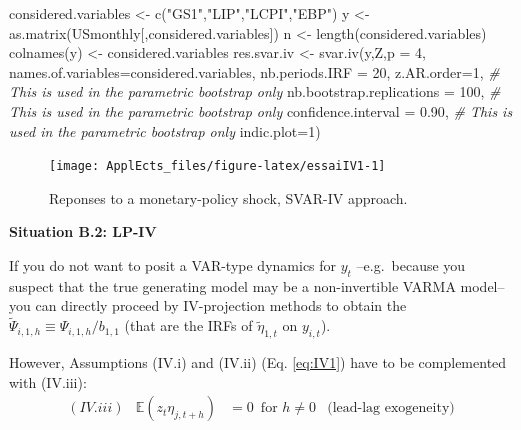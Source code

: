 \documentclass[
  12pt,
]{book}
\newenvironment{Shaded}{\begin{snugshade}}{\end{snugshade}}
\newcommand{\AttributeTok}[1]{\textcolor[rgb]{0.77,0.63,0.00}{#1}}
\newcommand{\CommentTok}[1]{\textcolor[rgb]{0.56,0.35,0.01}{\textit{#1}}}
\newcommand{\DecValTok}[1]{\textcolor[rgb]{0.00,0.00,0.81}{#1}}
\newcommand{\FloatTok}[1]{\textcolor[rgb]{0.00,0.00,0.81}{#1}}
\newcommand{\FunctionTok}[1]{\textcolor[rgb]{0.00,0.00,0.00}{#1}}
\newcommand{\NormalTok}[1]{#1}
\newcommand{\OtherTok}[1]{\textcolor[rgb]{0.56,0.35,0.01}{#1}}
\newcommand{\StringTok}[1]{\textcolor[rgb]{0.31,0.60,0.02}{#1}}
\theoremstyle{definition}
\theoremstyle{definition}
\theoremstyle{definition}
\theoremstyle{definition}
\theoremstyle{remark}
\begin{document}
\begin{Shaded}
\begin{Highlighting}[]
\NormalTok{considered.variables }\OtherTok{\textless{}{-}} \FunctionTok{c}\NormalTok{(}\StringTok{"GS1"}\NormalTok{,}\StringTok{"LIP"}\NormalTok{,}\StringTok{"LCPI"}\NormalTok{,}\StringTok{"EBP"}\NormalTok{)}
\NormalTok{y }\OtherTok{\textless{}{-}} \FunctionTok{as.matrix}\NormalTok{(USmonthly[,considered.variables])}
\NormalTok{n }\OtherTok{\textless{}{-}} \FunctionTok{length}\NormalTok{(considered.variables)}
\FunctionTok{colnames}\NormalTok{(y) }\OtherTok{\textless{}{-}}\NormalTok{ considered.variables}
\NormalTok{res.svar.iv }\OtherTok{\textless{}{-}} \FunctionTok{svar.iv}\NormalTok{(y,Z,}\AttributeTok{p =} \DecValTok{4}\NormalTok{,}
                       \AttributeTok{names.of.variables=}\NormalTok{considered.variables,}
                       \AttributeTok{nb.periods.IRF =} \DecValTok{20}\NormalTok{,}
                       \AttributeTok{z.AR.order=}\DecValTok{1}\NormalTok{, }\CommentTok{\# This is used in the parametric bootstrap only}
                       \AttributeTok{nb.bootstrap.replications =} \DecValTok{100}\NormalTok{, }\CommentTok{\# This is used in the parametric bootstrap only}
                       \AttributeTok{confidence.interval =} \FloatTok{0.90}\NormalTok{, }\CommentTok{\# This is used in the parametric bootstrap only}
                       \AttributeTok{indic.plot=}\DecValTok{1}\NormalTok{)}
\end{Highlighting}
\end{Shaded}

\begin{figure}
\texttt{[image: ApplEcts\_files/figure-latex/essaiIV1-1]} \caption{Reponses to a monetary-policy shock, SVAR-IV approach.}\label{fig:essaiIV1}
\end{figure}

\textbf{Situation B.2: LP-IV}

If you do not want to posit a VAR-type dynamics for \(y_t\) --e.g.~because you suspect that the true generating model may be a non-invertible VARMA model-- you can directly proceed by IV-projection methods to obtain the \(\tilde\Psi_{i,1,h}\equiv \Psi_{i,1,h}/b_{1,1}\) (that are the IRFs of \(\tilde\eta_{1,t}\) on \(y_{i,t}\)).

However, Assumptions (IV.i) and (IV.ii) (Eq. \eqref{eq:IV1}) have to be complemented with (IV.iii):
\begin{equation*}
\begin{array}{llll}
(IV.iii) & \mathbb{E}(z_t \eta_{j,t+h}) &= 0 \, \mbox{ for } h \ne 0 & \mbox{(lead-lag exogeneity)}
\end{array}
\end{equation*}
\end{document}
